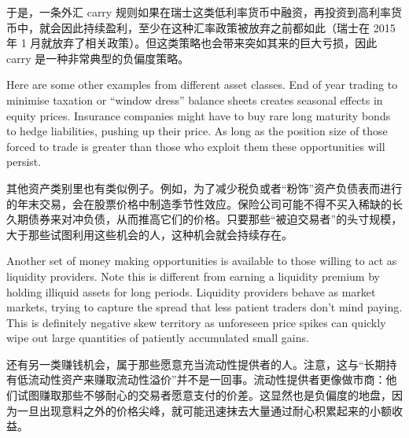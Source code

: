 \begin{chineseblock}于是，一条外汇 carry 规则如果在瑞士这类低利率货币中融资，再投资到高利率货币中，就会因此持续盈利，至少在这种汇率政策被放弃之前都如此（瑞士在 2015 年 1 月就放弃了相关政策）。但这类策略也会带来突如其来的巨大亏损，因此 carry 是一种非常典型的负偏度策略。\end{chineseblock}

\bipairgap

\begin{englishblock} Here are some other examples from different asset classes. End of year trading to minimise taxation or ``window dress'' balance sheets creates seasonal effects in equity prices. Insurance companies might have to buy rare long maturity bonds to hedge liabilities, pushing up their price. As long as the position size of those forced to trade is greater than those who exploit them these opportunities will persist. \end{englishblock}

\begin{chineseblock}其他资产类别里也有类似例子。例如，为了减少税负或者“粉饰”资产负债表而进行的年末交易，会在股票价格中制造季节性效应。保险公司可能不得不买入稀缺的长久期债券来对冲负债，从而推高它们的价格。只要那些“被迫交易者”的头寸规模，大于那些试图利用这些机会的人，这种机会就会持续存在。\end{chineseblock}

\bipairgap

\begin{englishblock} Another set of money making opportunities is available to those willing to act as liquidity providers. Note this is different from earning a liquidity premium by holding illiquid assets for long periods. Liquidity providers behave as market markets, trying to capture the spread that less patient traders don't mind paying. This is definitely negative skew territory as unforeseen price spikes can quickly wipe out large quantities of patiently accumulated small gains. \end{englishblock}

\begin{chineseblock}还有另一类赚钱机会，属于那些愿意充当流动性提供者的人。注意，这与“长期持有低流动性资产来赚取流动性溢价”并不是一回事。流动性提供者更像做市商：他们试图赚取那些不够耐心的交易者愿意支付的价差。这显然也是负偏度的地盘，因为一旦出现意料之外的价格尖峰，就可能迅速抹去大量通过耐心积累起来的小额收益。\end{chineseblock}


